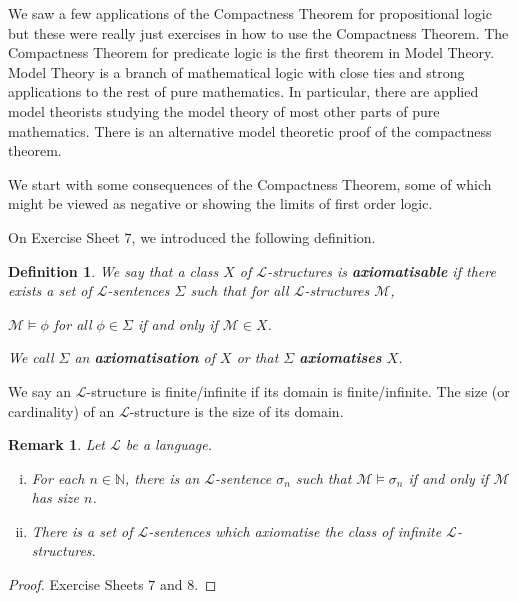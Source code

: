 \documentclass[11pt]{article}
\newtheorem{remark}[theorem]{Remark}
\newtheorem{definition}[theorem]{Definition}
\newcommand{\mcal}[1]{\mathcal{#1}}
\newcommand{\N}{\mathbb{N}}
\begin{document}
We saw a few applications of the Compactness Theorem for propositional logic but these were really just exercises in how to use the Compactness Theorem. The Compactness Theorem for predicate logic is the first theorem in Model Theory. Model Theory is a branch of mathematical logic with close ties and strong applications to the rest of pure mathematics. In particular, there are applied model theorists studying the model theory of most other parts of pure mathematics. There is an alternative model theoretic proof of the compactness theorem.

We start with some consequences of the Compactness Theorem, some of which might be viewed as negative or showing the limits of first order logic.

\goodbreak

On Exercise Sheet $7$, we introduced the following definition.
\begin{definition}
We say that a class $X$ of $\mcal{L}$-structures is \textbf{axiomatisable} if there exists a set of $\mcal{L}$-sentences $\Sigma$ such that for all $\mcal{L}$-structures $\mcal{M}$,
\begin{center}
$\mcal{M}\models \phi$ for all $\phi\in\Sigma$ if and only if $\mcal{M}\in X$.
\end{center}
We call $\Sigma$ an \textbf{axiomatisation} of $X$ or that $\Sigma$ \textbf{axiomatises} $X$.
\end{definition}

We say an $\mcal{L}$-structure is finite/infinite if its domain is finite/infinite. The size (or cardinality) of an $\mcal{L}$-structure is the size of its domain.


\begin{remark}
Let $\mcal{L}$ be a language.
\begin{enumerate}[(i)]
\item For each $n\in\N$,
there is an $\mcal{L}$-sentence $\sigma_n$ such that $\mcal{M}\models\sigma_n$ if and only if $\mcal{M}$ has size $n$.
\item
There is a set of $\mcal{L}$-sentences which axiomatise the class of infinite $\mcal{L}$-structures.
\end{enumerate}
\end{remark}

\begin{proof}
Exercise Sheets $7$ and $8$.
\end{proof}
\end{document}
